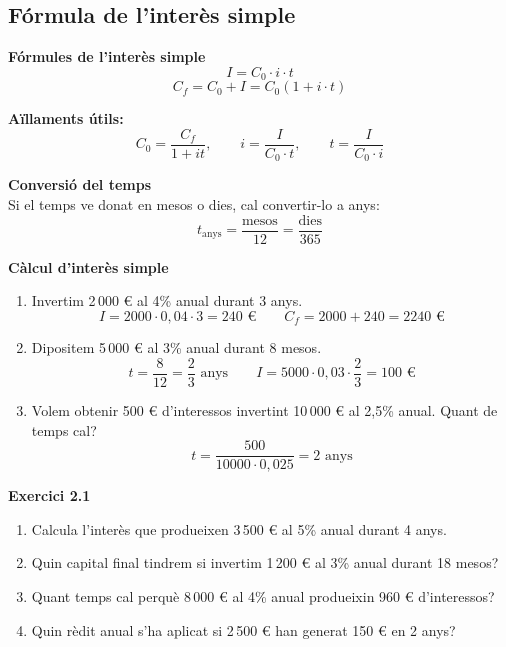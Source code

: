 \documentclass[12pt]{article}
\begin{document}
\subsection{Fórmula de l'interès simple}

\begin{concept}
\textbf{Fórmules de l'interès simple}\\
\[
\boxed{I = C_0 \cdot i \cdot t}
\]
\[
\boxed{C_f = C_0 + I = C_0(1 + i \cdot t)}
\]

\textbf{Aïllaments útils:}
\[
C_0 = \dfrac{C_f}{1+it}, \qquad
i = \dfrac{I}{C_0 \cdot t}, \qquad
t = \dfrac{I}{C_0 \cdot i}
\]

\textbf{Conversió del temps}\\
Si el temps ve donat en mesos o dies, cal convertir-lo a anys:
\[
t_{\text{anys}} = \dfrac{\text{mesos}}{12} = \dfrac{\text{dies}}{365}
\]
\end{concept}

\begin{exemple}
\textbf{Càlcul d'interès simple}
\begin{enumerate}[label=\alph*)]
    \item Invertim 2\,000 € al 4\% anual durant 3 anys.
    \[
    I = 2000 \cdot 0{,}04 \cdot 3 = 240 \text{ €} \qquad C_f = 2000 + 240 = 2240 \text{ €}
    \]
    \item Dipositem 5\,000 € al 3\% anual durant 8 mesos.
    \[
    t = \dfrac{8}{12} = \dfrac{2}{3} \text{ anys} \qquad
    I = 5000 \cdot 0{,}03 \cdot \dfrac{2}{3} = 100 \text{ €}
    \]
    \item Volem obtenir 500 € d'interessos invertint 10\,000 € al 2{,}5\% anual. Quant de temps cal?
    \[
    t = \dfrac{500}{10000 \cdot 0{,}025} = 2 \text{ anys}
    \]
\end{enumerate}
\end{exemple}

\begin{exercici}
\textbf{Exercici 2.1}\\
\begin{enumerate}[label=\alph*)]
    \item Calcula l'interès que produeixen 3\,500 € al 5\% anual durant 4 anys.
    \item Quin capital final tindrem si invertim 1\,200 € al 3\% anual durant 18 mesos?
    \item Quant temps cal perquè 8\,000 € al 4\% anual produeixin 960 € d'interessos?
    \item Quin rèdit anual s'ha aplicat si 2\,500 € han generat 150 € en 2 anys?
\end{enumerate}
\end{exercici}
\end{document}

